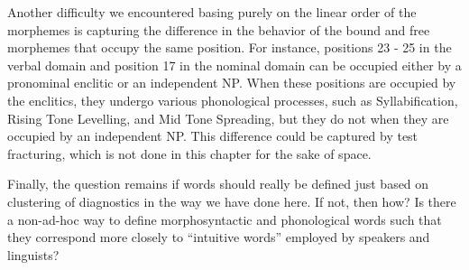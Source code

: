 \documentclass[output=paper]{langscibook}
\begin{document}
Another difficulty we encountered basing purely on the linear order of the morphemes is capturing the difference in the behavior of the bound and free morphemes that occupy the same position. For instance, positions 23 - 25 in the verbal domain and position 17 in the nominal domain can be occupied either by a pronominal enclitic or an independent NP. When these positions are occupied by the enclitics, they undergo various phonological processes, such as Syllabification, Rising Tone Levelling, and Mid Tone Spreading, but they do not when they are occupied by an independent NP. This difference could be captured by test fracturing, which is not done in this chapter for the sake of space. 

Finally, the question remains if words should really be defined just based on clustering of diagnostics in the way we have done here. If not, then how? Is there a non-ad-hoc way to define morphosyntactic and phonological words such that they correspond more closely to “intuitive words” employed by speakers and linguists? 

\newpage
\printglossary

\sloppy\printbibliography[heading=subbibliography,notkeyword=this]
\end{document}
